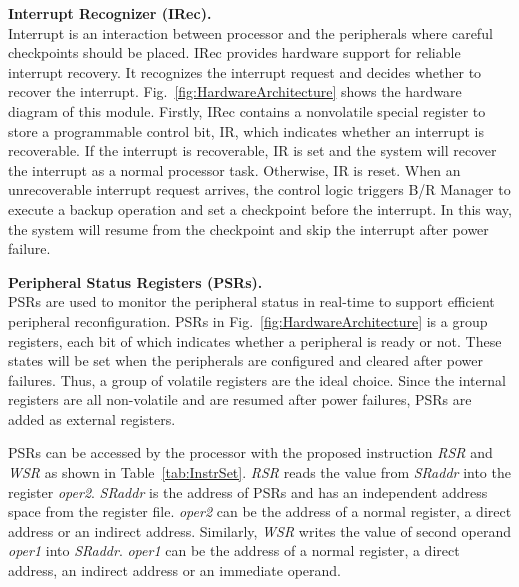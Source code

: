 \vspace{5pt}
\noindent\textbf{Interrupt Recognizer (IRec).} \\
%
Interrupt is an interaction between processor and the peripherals where careful checkpoints should be placed.
IRec provides hardware support for reliable interrupt recovery.
It recognizes the interrupt request and decides whether to recover the interrupt.
Fig.~\ref{fig:HardwareArchitecture} shows the hardware diagram of this module.
Firstly, IRec contains a nonvolatile special register to store a programmable control bit, IR, which indicates whether an interrupt is recoverable.
If the interrupt is recoverable, IR is set and the system will recover the interrupt as a normal processor task.
Otherwise, IR is reset.
When an unrecoverable interrupt request arrives, the control logic triggers B/R Manager to execute a backup operation and set a checkpoint before the interrupt.
In this way, the system will resume from the checkpoint and skip the interrupt after power failure.

\vspace{5pt}
\noindent\textbf{Peripheral Status Registers {(PSRs)}.} \\
PSRs are used to monitor the peripheral status in real-time to support efficient peripheral reconfiguration.
PSRs in Fig.~\ref{fig:HardwareArchitecture} is a group registers, each bit of which indicates whether a peripheral is ready or not.
These states will be set when the peripherals are configured and cleared after power failures.
Thus, a group of volatile registers are the ideal choice.
Since the internal registers are all non-volatile and are resumed after power failures, PSRs are added as external registers.

PSRs can be accessed by the processor with the proposed instruction \emph{RSR} and \emph{WSR} as shown in Table~\ref{tab:InstrSet}.
\emph{RSR} reads the value from \emph{SRaddr} into the register \emph{oper2}.
\emph{SRaddr} is the address of PSRs and has an independent address space from the register file.
\emph{oper2} can be the address of a normal register, a direct address or an indirect address.
Similarly, \emph{WSR} writes the value of second operand \emph{oper1} into \emph{SRaddr}.
\emph{oper1} can be the address of a normal register, a direct address, an indirect address or an immediate operand.

